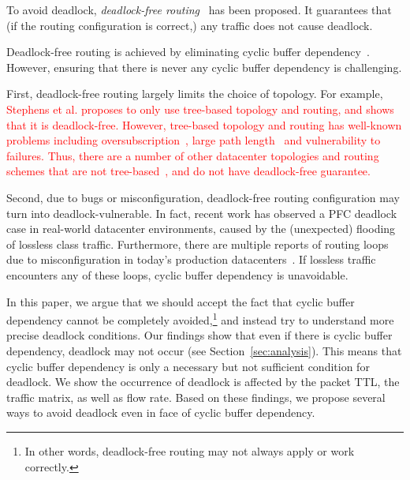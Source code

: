 To avoid deadlock, {\em deadlock-free routing}~\cite{tcpbolt} has been
proposed. It guarantees that (if the routing configuration is correct,) any
traffic does not cause deadlock.

 Deadlock-free routing is achieved by eliminating cyclic buffer
dependency~\cite{deadlockfree}.  However, ensuring that there is never any
cyclic buffer dependency is challenging.

First, deadlock-free routing largely limits the choice of topology. For example,
\textcolor{red}{Stephens et al. \cite{tcpbolt} proposes to only use tree-based topology and routing, and shows
that it is deadlock-free.  However, tree-based topology and routing has
well-known problems including oversubscription~\cite{fattree}, large path
length~\cite{jellyfish} and vulnerability to failures.  Thus, there are a number of
other datacenter topologies and routing schemes that are not
tree-based~\cite{bcube, camcube, jellyfish}, and do not have deadlock-free
guarantee.}

Second, due to bugs or misconfiguration, deadlock-free routing configuration may
turn into deadlock-vulnerable. In fact, recent work has observed a PFC deadlock
case in real-world datacenter environments\cite{rdmascale}, caused by the
(unexpected) flooding of lossless class traffic. Furthermore, there are multiple
reports of routing loops due to misconfiguration in today's production
datacenters~\cite{everflow, libra}. If lossless traffic encounters any of these
loops, cyclic buffer dependency is unavoidable.

In this paper, we argue that we should accept the fact that cyclic buffer
dependency cannot be completely avoided,\footnote{In other words, deadlock-free
routing may not always apply or work correctly.} and instead try to
understand more precise deadlock conditions.  Our findings show that even if
there is cyclic buffer dependency, deadlock may not occur (see
Section~\ref{sec:analysis}).  This means that cyclic buffer dependency is only a
necessary but not sufficient condition for deadlock.  We show the occurrence of
deadlock is affected by the packet TTL, the traffic matrix, as well as flow
rate. Based on these findings, we propose several ways to avoid deadlock even in
face of cyclic buffer dependency.



